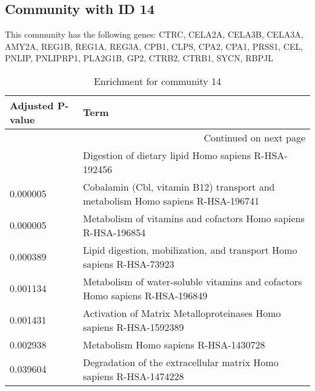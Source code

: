 \subsection*{Community with ID 14}
This community has the following genes: CTRC, CELA2A, CELA3B, CELA3A, AMY2A, REG1B, REG1A, REG3A, CPB1, CLPS, CPA2, CPA1, PRSS1, CEL, PNLIP, PNLIPRP1, PLA2G1B, GP2, CTRB2, CTRB1, SYCN, RBPJL
\\
\begin{longtable}{p{2.4cm}p{14.5cm}}
\caption{Enrichment for community 14}\\
\toprule
Adjusted \newline P-value &                                                                             Term \\
\midrule
\endhead
\midrule
\multicolumn{2}{r}{{Continued on next page}} \\
\midrule
\endfoot

\bottomrule
\endlastfoot
                 0.000004 &                             Digestion of dietary lipid Homo sapiens R-HSA-192456 \\
                 0.000005 &  Cobalamin (Cbl, vitamin B12) transport and metabolism Homo sapiens R-HSA-196741 \\
                 0.000005 &                   Metabolism of vitamins and cofactors Homo sapiens R-HSA-196854 \\
                 0.000389 &            Lipid digestion, mobilization, and transport Homo sapiens R-HSA-73923 \\
                 0.001134 &     Metabolism of water-soluble vitamins and cofactors Homo sapiens R-HSA-196849 \\
                 0.001431 &               Activation of Matrix Metalloproteinases Homo sapiens R-HSA-1592389 \\
                 0.002938 &                                            Metabolism Homo sapiens R-HSA-1430728 \\
                 0.039604 &               Degradation of the extracellular matrix Homo sapiens R-HSA-1474228 \\
\end{longtable}


